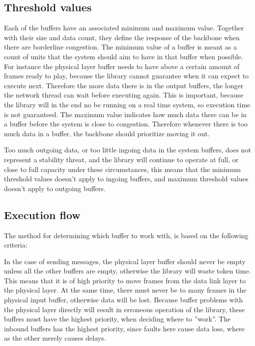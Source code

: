 \subsection{Threshold values}
Each of the buffers have an associated minimum and maximum value. Together with their size and data count, they define the response of the backbone when there are borderline congestion.
The minimum value of a buffer is meant as a count of units that the system should aim to have in that buffer when possible. For instance the physical layer buffer needs to have above a certain amount of frames ready to play, because the library cannot guarantee when it can expect to execute next. Therefore the more data there is in the output buffers, the longer the network thread can wait before executing again. This is important, because the library will in the end no be running on a real time system, so execution time is not guaranteed.
The maximum value indicates how much data there can be in a buffer before the system is close to congestion. Therefore whenever there is too much data in a buffer, the backbone should prioritize moving it out.


Too much outgoing data, or too little ingoing data in the system buffers, does not represent a stability threat, and the library will continue to operate at full, or close to full capacity under these circumstances, this means that the minimum threshold values doesn't apply to ingoing buffers, and maximum threshold values doesn't apply to outgoing buffers.


\subsection{Execution flow}
The method for determining which buffer to work with, is based on the following criteria:

In the case of sending messages, the physical layer buffer should never be empty unless all the other buffers are empty, otherwise the library will waste token time. This means that it is of high priority to move frames from the data link layer to the physical layer.
At the same time, there must never be to many frames in the physical input buffer, otherwise data will be lost. Because buffer problems with the physical layer directly will result in erroneous operation of the library, these buffers must have the highest priority, when deciding where to ''work''. The inbound buffers has the highest priority, since faults here cause data loss, where as the other merely causes delays.

